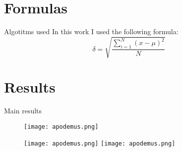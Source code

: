 \documentclass{beamer}
\begin{document}
\section{Formulas}

\begin{frame}{Algotitms used} %
In this work I used the following formula:
\bigskip
\begin{equation}
    \delta = \sqrt{\frac{\displaystyle\sum_{i=1}^{N}{(x - \mu)^2}}{N}}
\end{equation}
    
\end{frame}

\section{Results} 

\begin{frame}{Main results}

\begin{figure} 
    \centering %
    \texttt{[image: apodemus.png]} %
\end{figure}

\begin{figure} 
    \centering 
    \texttt{[image: apodemus.png]} %
    \pause \texttt{[image: apodemus.png]} 
\end{figure} 
\end{frame}
\end{document}
